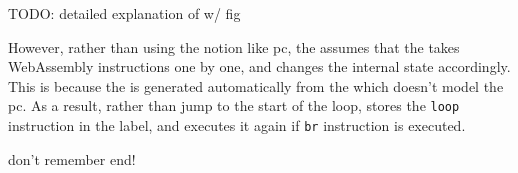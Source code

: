 TODO: detailed explanation of \spectecp{} w/ fig

However, rather than using the notion like pc, the \spectecp{} assumes that the
 takes WebAssembly instructions one by one, and changes the
internal state accordingly.
This is because the \spectecp{} is generated automatically from the 
which doesn't model the pc.
As a result, rather than jump to the start of the loop, \spectecp{} stores the
\texttt{loop} instruction in the label, and executes it again if \texttt{br}
instruction is executed.

don't remember end!





